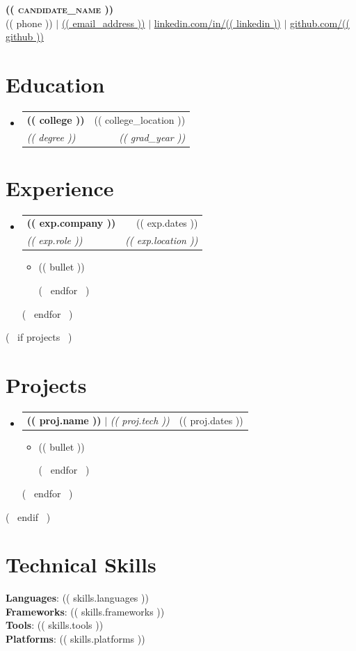 \documentclass[letterpaper,11pt]{article}
\newcommand{\resumeItem}[1]{
  \item\small{#1 \vspace{-2pt}}
}
\newcommand{\resumeSubheading}[4]{
  \vspace{-2pt}\item
    \begin{tabularx}{\textwidth}{X r}
      \textbf{#1} & \small #2 \\
      \textit{\small #3} & \textit{\small #4} \\
    \end{tabularx}\vspace{-7pt}
}
\newcommand{\resumeProjectHeading}[2]{
  \item
    \begin{tabularx}{\textwidth}{X r}
      \small #1 & \small #2 \\
    \end{tabularx}\vspace{-7pt}
}
\newcommand{\resumeSubHeadingListStart}{\begin{itemize}[leftmargin=0.15in, label={}]}
\newcommand{\resumeSubHeadingListEnd}{\end{itemize}}
\newcommand{\resumeItemListStart}{\begin{itemize}}
\newcommand{\resumeItemListEnd}{\end{itemize}\vspace{-5pt}}
\begin{document}
\begin{center}
\textbf{\Huge \scshape (( candidate_name ))} \\ \vspace{1pt}
\small (( phone )) $|$
\href{mailto:(( email_address ))}{(( email_address ))} $|$
\href{https://linkedin.com/in/(( linkedin ))}{linkedin.com/in/(( linkedin ))} $|$
\href{https://github.com/(( github ))}{github.com/(( github ))}
\end{center}

\section{Education}
\resumeSubHeadingListStart
\resumeSubheading
{(( college ))}{(( college_location ))}
{(( degree ))}{(( grad_year ))}
\resumeSubHeadingListEnd

\section{Experience}
\resumeSubHeadingListStart
(~ for exp in experience ~)
\resumeSubheading
{(( exp.company ))}{(( exp.dates ))}
{(( exp.role ))}{(( exp.location ))}
\resumeItemListStart
(~ for bullet in exp.bullets ~)
\resumeItem{(( bullet ))}
(~ endfor ~)
\resumeItemListEnd
(~ endfor ~)
\resumeSubHeadingListEnd

(~ if projects ~)
\section{Projects}
\resumeSubHeadingListStart
(~ for proj in projects ~)
\resumeProjectHeading
{\textbf{(( proj.name ))} $|$ \emph{(( proj.tech ))}}{(( proj.dates ))}
\resumeItemListStart
(~ for bullet in proj.bullets ~)
\resumeItem{(( bullet ))}
(~ endfor ~)
\resumeItemListEnd
(~ endfor ~)
\resumeSubHeadingListEnd
(~ endif ~)

\section{Technical Skills}
\begin{itemize}[leftmargin=0.15in, label={}]
\small{\item{
\textbf{Languages}{: (( skills.languages ))} \\
\textbf{Frameworks}{: (( skills.frameworks ))} \\
\textbf{Tools}{: (( skills.tools ))} \\
\textbf{Platforms}{: (( skills.platforms ))}
}}
\end{itemize}
\end{document}
